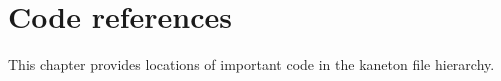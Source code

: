 
%
%

\chapter{Code references}

This chapter provides locations of important code in the kaneton file
hierarchy.

